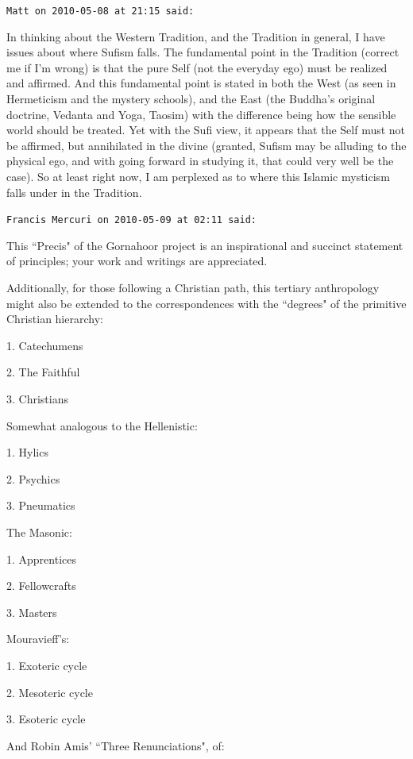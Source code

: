 \begin{footnotesize}\begin{sffamily}



\texttt{Matt on 2010-05-08 at 21:15 said: }

In thinking about the Western Tradition, and the Tradition in general, I have issues about where Sufism falls. The fundamental point in the Tradition (correct me if I'm wrong) is that the pure Self (not the everyday ego) must be realized and affirmed. And this fundamental point is stated in both the West (as seen in Hermeticism and the mystery schools), and the East (the Buddha's original doctrine, Vedanta and Yoga, Taosim) with the difference being how the sensible world should be treated. Yet with the Sufi view, it appears that the Self must not be affirmed, but annihilated in the divine (granted, Sufism may be alluding to the physical ego, and with going forward in studying it, that could very well be the case). So at least right now, I am perplexed as to where this Islamic mysticism falls under in the Tradition.


\hfill

\texttt{Francis Mercuri on 2010-05-09 at 02:11 said: }

This ``Precis" of the Gornahoor project is an inspirational and succinct statement of principles; your work and writings are appreciated.

Additionally, for those following a Christian path, this tertiary anthropology might also be extended to the correspondences with the ``degrees" of the primitive Christian hierarchy:

1. Catechumens

2. The Faithful

3. Christians 

Somewhat analogous to the Hellenistic:

1. Hylics

2. Psychics

3. Pneumatics

The Masonic:

1. Apprentices

2. Fellowcrafts

3. Masters

Mouravieff's:

1. Exoteric cycle

2. Mesoteric cycle

3. Esoteric cycle

And Robin Amis’ ``Three Renunciations", of:


\end{sffamily}
\end{footnotesize}
